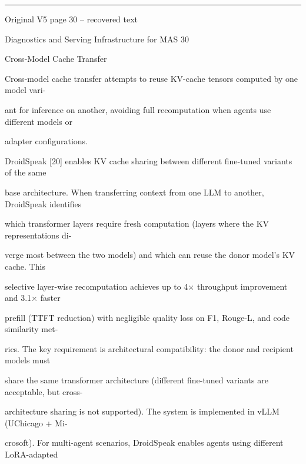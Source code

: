\par\smallskip\noindent\rule{\textwidth}{0.4pt}\par{\sffamily\footnotesize Original V5 page 30 -- recovered text}\par\begin{flushleft}\footnotesize\ttfamily
\par\smallskip
\par\smallskip
\noindent Diagnostics and Serving Infrastructure for MAS 30\par
\par\smallskip
\par\smallskip
\par\smallskip
{} Cross-Model Cache Transfer\par
\noindent Cross-model cache transfer attempts to reuse KV-cache tensors computed by one model vari-\par
\noindent ant for inference on another, avoiding full recomputation when agents use different models or\par
\noindent adapter configurations.\par
\noindent  DroidSpeak [20] enables KV cache sharing between different fine-tuned variants of the same\par
\noindent base architecture. When transferring context from one LLM to another, DroidSpeak identifies\par
\noindent which transformer layers require fresh computation (layers where the KV representations di-\par
\noindent verge most between the two models) and which can reuse the donor model’s KV cache. This\par
\noindent selective layer-wise recomputation achieves up to 4× throughput improvement and 3.1× faster\par
\noindent prefill (TTFT reduction) with negligible quality loss on F1, Rouge-L, and code similarity met-\par
\noindent rics. The key requirement is architectural compatibility: the donor and recipient models must\par
\noindent share the same transformer architecture (different fine-tuned variants are acceptable, but cross-\par
\noindent architecture sharing is not supported). The system is implemented in vLLM (UChicago + Mi-\par
\noindent crosoft). For multi-agent scenarios, DroidSpeak enables agents using different LoRA-adapted\par

\end{flushleft}
